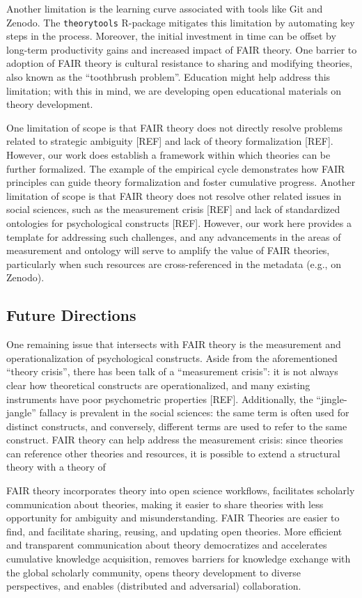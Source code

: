 \documentclass[
  man,floatsintext]{apa6}
\begin{document}
Another limitation is the learning curve associated with tools like Git and Zenodo.
The \texttt{theorytools} R-package mitigates this limitation by automating key steps in the process.
Moreover, the initial investment in time can be offset by long-term productivity gains and increased impact of FAIR theory.
One barrier to adoption of FAIR theory is cultural resistance to sharing and modifying theories, also known as the ``toothbrush problem''.
Education might help address this limitation; with this in mind,
we are developing open educational materials on theory development.

One limitation of scope is that FAIR theory does not directly resolve problems related to strategic ambiguity {[}REF{]} and lack of theory formalization {[}REF{]}.
However, our work does establish a framework within which theories can be further formalized.
The example of the empirical cycle demonstrates how FAIR principles can guide theory formalization and foster cumulative progress.
Another limitation of scope is that FAIR theory does not resolve other related issues in social sciences, such as the measurement crisis {[}REF{]} and lack of standardized ontologies for psychological constructs {[}REF{]}.
However, our work here provides a template for addressing such challenges,
and any advancements in the areas of measurement and ontology will serve to amplify the value of FAIR theories, particularly when such resources are cross-referenced in the metadata (e.g., on Zenodo).

\subsection{Future Directions}\label{future-directions}

One remaining issue that intersects with FAIR theory is the measurement and operationalization of psychological constructs.
Aside from the aforementioned ``theory crisis'', there has been talk of a ``measurement crisis'':
it is not always clear how theoretical constructs are operationalized, and many existing instruments have poor psychometric properties {[}REF{]}.
Additionally, the ``jingle-jangle'' fallacy is prevalent in the social sciences:
the same term is often used for distinct constructs, and conversely, different terms are used to refer to the same construct.
FAIR theory can help address the measurement crisis:
since theories can reference other theories and resources, it is possible to extend a structural theory with a theory of

FAIR theory incorporates theory into open science workflows,
facilitates scholarly communication about theories,
making it easier to share theories with less opportunity for ambiguity and misunderstanding.
FAIR Theories are easier to find, and facilitate sharing, reusing, and updating open theories.
More efficient and transparent communication about theory democratizes and accelerates cumulative knowledge acquisition,
removes barriers for knowledge exchange with the global scholarly community,
opens theory development to diverse perspectives, and enables (distributed and adversarial) collaboration.
\end{document}
